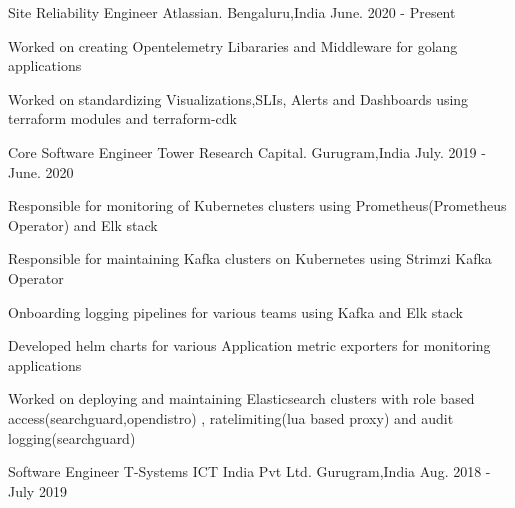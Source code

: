 

\begin{cventries}

    \cventry
    {Site Reliability Engineer} %
    {Atlassian.} %
    {Bengaluru,India} %
    {June. 2020 - Present} %
    {
      \begin{cvitems} %
               \item { Worked on creating Opentelemetry Libararies and Middleware for golang applications }
               \item { Worked on standardizing Visualizations,SLIs, Alerts and Dashboards using terraform modules and terraform-cdk} 		
	  \end{cvitems}
    }
    \cventry
    {Core Software Engineer} %
    {Tower Research Capital.} %
    {Gurugram,India} %
    {July. 2019 - June. 2020} %
    {
      \begin{cvitems} %
	    \item { Responsible for monitoring of  Kubernetes clusters using Prometheus(Prometheus Operator) and Elk stack }
               \item { Responsible for maintaining  Kafka clusters on Kubernetes using  Strimzi Kafka Operator }
               \item { Onboarding logging pipelines for various teams using Kafka and Elk stack }
               \item { Developed helm charts for various Application metric exporters for monitoring applications  }
               \item { Worked on deploying and maintaining Elasticsearch clusters with role based access(searchguard,opendistro) , ratelimiting(lua based proxy) and audit logging(searchguard)} 		
	  \end{cvitems}
    }
    \cventry
    {Software Engineer} %
    {T-Systems ICT India Pvt Ltd.} %
    {Gurugram,India} %
    {Aug. 2018 - July 2019} %
    {
      \begin{cvitems} %

\end{cvitems}}
\end{cventries}
